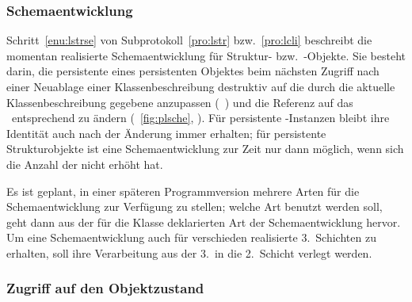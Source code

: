 \subsubsection{Schemaentwicklung}
%
\iftrue%
Schritt~\ref{enu:lstrse} von Subprotokoll~\ref{pro:lstr}
bzw.\ \ref{pro:lcli} beschreibt
\else%
Schritt~\ref{enu:lstrse} von Subprotokoll~\ref{pro:lstr}
bzw.\ Schritt~\ref{enu:lclse} von Subprotokoll \ref{pro:lcli}
beschreiben
\fi%
die momentan realisierte Schemaentwicklung f\"{u}r Struktur-
bzw.\ \clos-Objekte. Sie besteht darin, die persistente
\representation{} eines
persistenten Objektes beim n\"{a}chsten Zugriff nach einer Neuablage
einer Klassenbeschreibung destruktiv auf die durch
die aktuelle Klassenbeschreibung gegebene \representationform{}
anzupassen (\ \cite[]{bib:bj89}) und die Referenz auf das
\clsdo\ entsprechend zu \"{a}ndern (\figurename~\ref{fig:plsche},
\citepage{\pageref{fig:plsche}}). F\"{u}r persistente \clos-Instanzen
bleibt ihre Identit\"{a}t auch nach der \"{A}nderung immer erhalten; f\"{u}r
persistente Strukturobjekte ist eine Schemaentwicklung zur Zeit nur
dann m\"{o}glich, wenn sich die Anzahl der \Slt[s]\/ nicht erh\"{o}ht hat.
%
\par{}Es ist geplant, in einer sp\"{a}teren Programmversion mehrere Arten
f\"{u}r die Schemaentwicklung zur Verf\"{u}gung zu stellen; welche Art benutzt
werden soll, geht dann aus der f\"{u}r die Klasse deklarierten Art der
Schemaentwicklung hervor. Um eine Schemaentwicklung auch f\"{u}r verschieden
realisierte 3.~Schichten zu erhalten, soll ihre Verarbeitung
aus der 3.\ in die 2.~Schicht verlegt werden.
%
\subsubsection{Zugriff auf den Objektzustand}
%
